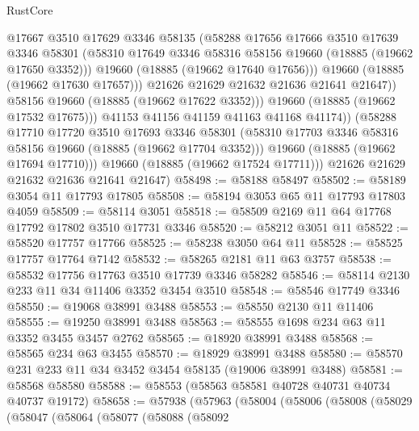 \begin{lexlean}{RustCore}
\begin{coremodule}
                      @17667
                      @3510
                      @17629
                      @3346
                      @58135
                      (@58288
                        @17656
                        @17666
                        @3510
                        @17639
                        @3346
                        @58301
                        (@58310 @17649 @3346 @58316 @58156 @19660 (@18885 (@19662 @17650 @3352)))
                        @19660
                        (@18885 (@19662 @17640 @17656)))
                      @19660
                      (@18885 (@19662 @17630 @17657)))
                    @21626
                    @21629
                    @21632
                    @21636
                    @21641
                    @21647))
                @58156
                @19660
                (@18885 (@19662 @17622 @3352)))
              @19660
              (@18885 (@19662 @17532 @17675)))
            @41153
            @41156
            @41159
            @41163
            @41168
            @41174))
        (@58288
          @17710
          @17720
          @3510
          @17693
          @3346
          @58301
          (@58310 @17703 @3346 @58316 @58156 @19660 (@18885 (@19662 @17704 @3352)))
          @19660
          (@18885 (@19662 @17694 @17710)))
        @19660
        (@18885 (@19662 @17524 @17711)))
      @21626
      @21629
      @21632
      @21636
      @21641
      @21647)
@58498 := @58188 @58497
@58502 := @58189 @3054 @11 @17793 @17805
@58508 := @58194 @3053 @65 @11 @17793 @17803 @4059
@58509 := @58114 @3051
@58518 := @58509 @2169 @11 @64 @17768 @17792 @17802 @3510 @17731 @3346
@58520 := @58212 @3051 @11
@58522 := @58520 @17757 @17766
@58525 := @58238 @3050 @64 @11
@58528 := @58525 @17757 @17764 @7142
@58532 := @58265 @2181 @11 @63 @3757
@58538 := @58532 @17756 @17763 @3510 @17739 @3346 @58282
@58546 := @58114 @2130 @233 @11 @34 @11406 @3352 @3454 @3510
@58548 := @58546 @17749 @3346
@58550 := @19068 @38991 @3488
@58553 := @58550 @2130 @11 @11406
@58555 := @19250 @38991 @3488
@58563 := @58555 @1698 @234 @63 @11 @3352 @3455 @3457 @2762
@58565 := @18920 @38991 @3488
@58568 := @58565 @234 @63 @3455
@58570 := @18929 @38991 @3488
@58580 := @58570 @231 @233 @11 @34 @3452 @3454 @58135 (@19006 @38991 @3488)
@58581 := @58568 @58580
@58588 := @58553 (@58563 @58581 @40728 @40731 @40734 @40737 @19172)
@58658 := @57938
    (@57963
      (@58004
        (@58006
          (@58008
            (@58029
              (@58047
                (@58064
                  (@58077
                    (@58088
                      (@58092

\end{coremodule}
\end{lexlean}
